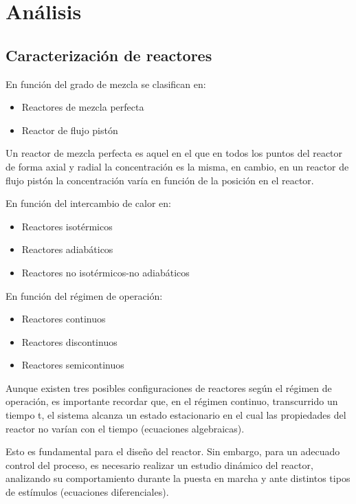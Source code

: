 \chapter{Análisis}
\section{Caracterización de reactores}
\noindent En función del grado de mezcla se clasifican en:
\begin{itemize}
  \item Reactores de mezcla perfecta
  \item Reactor de flujo pistón
\end{itemize}
\par
\noindent Un reactor de mezcla perfecta es aquel en el que en todos los puntos del reactor de forma axial y radial la concentración es la misma,
en cambio, en un reactor de flujo pistón la concentración varía en función de la posición en el reactor.

\noindent  En función del intercambio de calor en:
\begin{itemize}
  \item Reactores isotérmicos
  \item Reactores adiabáticos
  \item Reactores no isotérmicos-no adiabáticos
\end{itemize}
\noindent En función del régimen de operación:
\begin{itemize}
  \item Reactores continuos
  \item Reactores discontinuos
  \item Reactores semicontinuos
\end{itemize}
\noindent Aunque existen tres posibles configuraciones de reactores según el régimen de operación, es importante recordar que, en el régimen continuo, transcurrido un tiempo
t, el sistema alcanza un estado estacionario en el cual las propiedades del reactor no varían con el tiempo (ecuaciones algebraicas).

\noindent Esto es fundamental para el diseño del reactor. Sin embargo, para un adecuado control del proceso, es necesario realizar un estudio dinámico del reactor, analizando su comportamiento durante la puesta en marcha y ante distintos tipos de estímulos (ecuaciones diferenciales).

